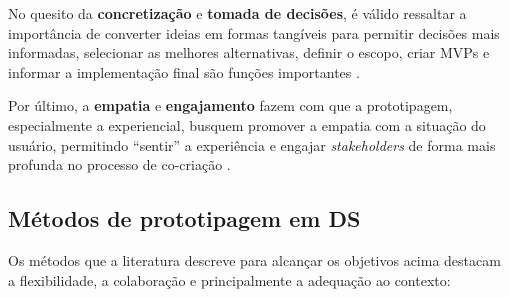 No quesito da \textbf{concretização} e \textbf{tomada de decisões}, é válido ressaltar a importância de converter ideias em formas tangíveis para permitir decisões mais informadas, selecionar as melhores alternativas, definir o escopo, criar MVPs e informar a implementação final são funções importantes \cite{nguyen2022human, Vieira2025, schlott2024design, quintero2021interdisciplinary, iriarte2023service}.

Por último, a \textbf{empatia} e \textbf{engajamento} fazem com que a prototipagem, especialmente a experiencial, busquem promover a empatia com a situação do usuário, permitindo ``sentir'' a experiência e engajar \textit{stakeholders} de forma mais profunda no processo de co-criação \cite{soto2023prototyping, lambe2022capabilities, kumar2023rheumatology}.

\subsection{Métodos de prototipagem em DS}

Os métodos que a literatura descreve para alcançar os objetivos acima destacam a flexibilidade, a colaboração e principalmente a adequação ao contexto:

